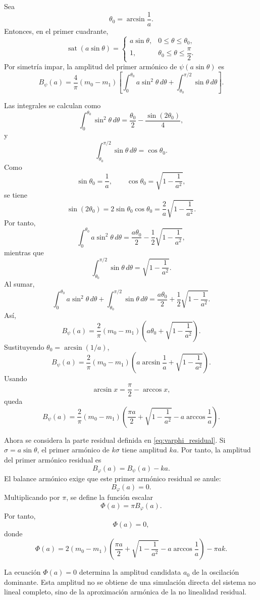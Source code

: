 \documentclass[journal]{IEEEtran}
\begin{document}
Sea
\[
\theta_0=\arcsin\frac{1}{a}.
\]
Entonces, en el primer cuadrante,
\[
\operatorname{sat}(a\sin\theta)=
\begin{cases}
a\sin\theta, & 0\le \theta\le \theta_0,\\[1ex]
1, & \theta_0\le \theta\le \dfrac{\pi}{2}.
\end{cases}
\]
Por simetría impar, la amplitud del primer armónico de
\(\psi(a\sin\theta)\) es
\[
B_\psi(a)
=
\frac{4}{\pi}(m_0-m_1)
\left[
\int_0^{\theta_0}a\sin^2\theta\,d\theta
+
\int_{\theta_0}^{\pi/2}\sin\theta\,d\theta
\right].
\]

Las integrales se calculan como
\[
\int_0^{\theta_0}\sin^2\theta\,d\theta
=
\frac{\theta_0}{2}
-
\frac{\sin(2\theta_0)}{4},
\]
y
\[
\int_{\theta_0}^{\pi/2}\sin\theta\,d\theta
=
\cos\theta_0.
\]
Como
\[
\sin\theta_0=\frac{1}{a},
\qquad
\cos\theta_0=
\sqrt{1-\frac{1}{a^2}},
\]
se tiene
\[
\sin(2\theta_0)
=
2\sin\theta_0\cos\theta_0
=
\frac{2}{a}\sqrt{1-\frac{1}{a^2}}.
\]
Por tanto,
\[
\int_0^{\theta_0}a\sin^2\theta\,d\theta
=
\frac{a\theta_0}{2}
-
\frac{1}{2}\sqrt{1-\frac{1}{a^2}},
\]
mientras que
\[
\int_{\theta_0}^{\pi/2}\sin\theta\,d\theta
=
\sqrt{1-\frac{1}{a^2}}.
\]
Al sumar,
\[
\int_0^{\theta_0}a\sin^2\theta\,d\theta
+
\int_{\theta_0}^{\pi/2}\sin\theta\,d\theta
=
\frac{a\theta_0}{2}
+
\frac{1}{2}\sqrt{1-\frac{1}{a^2}}.
\]
Así,
\[
B_\psi(a)
=
\frac{2}{\pi}(m_0-m_1)
\left(
a\theta_0+
\sqrt{1-\frac{1}{a^2}}
\right).
\]
Sustituyendo \(\theta_0=\arcsin(1/a)\),
\[
B_\psi(a)
=
\frac{2}{\pi}(m_0-m_1)
\left(
a\arcsin\frac{1}{a}
+
\sqrt{1-\frac{1}{a^2}}
\right).
\]
Usando
\[
\arcsin x=\frac{\pi}{2}-\arccos x,
\]
queda
\[
B_\psi(a)
=
\frac{2}{\pi}(m_0-m_1)
\left(
\frac{\pi a}{2}
+
\sqrt{1-\frac{1}{a^2}}
-
a\arccos\frac{1}{a}
\right).
\]

Ahora se considera la parte residual definida en \eqref{eq:varphi_residual}.
Si \(\sigma=a\sin\theta\), el primer armónico de \(k\sigma\) tiene amplitud
\(ka\). Por tanto, la amplitud del primer armónico residual es
\[
B_\varphi(a)=B_\psi(a)-ka.
\]
El balance armónico exige que este primer armónico residual se anule:
\[
B_\varphi(a)=0.
\]
Multiplicando por \(\pi\), se define la función escalar
\[
\Phi(a)=\pi B_\varphi(a).
\]
Por tanto,
\begin{equation}\label{eq:Phi}
\Phi(a)=0,
\end{equation}
donde
\[
\Phi(a)=
2(m_0-m_1)
\left(
\frac{\pi a}{2}
+
\sqrt{1-\frac{1}{a^2}}
-
a\arccos\frac{1}{a}
\right)
-\pi ak.
\]

La ecuación \(\Phi(a)=0\) determina la amplitud candidata \(a_0\) de la
oscilación dominante. Esta amplitud no se obtiene de una simulación directa
del sistema no lineal completo, sino de la aproximación armónica de la
no linealidad residual.
\end{document}
